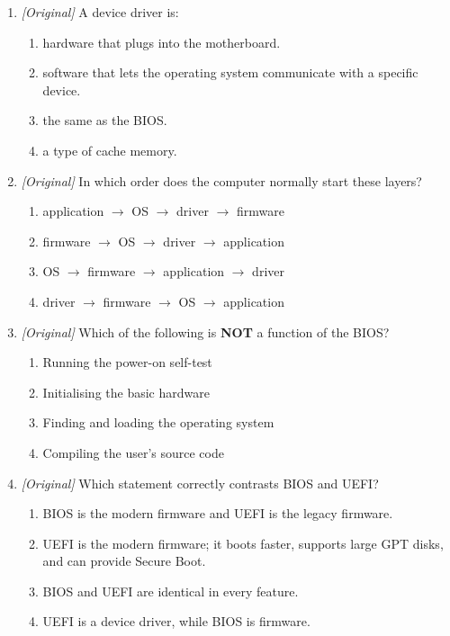 \begin{enumerate}[label=\textbf{Q\arabic*.}, leftmargin=*]
\begin{enumerate}[label=\Alph*.]
  \end{enumerate}
\item \textit{[Original]} A device driver is:
  \begin{enumerate}[label=\Alph*.]
    \item hardware that plugs into the motherboard.
    \item software that lets the operating system communicate with a
      specific device.
    \item the same as the BIOS.
    \item a type of cache memory.
  \end{enumerate}
\item \textit{[Original]} In which order does the computer normally start
  these layers?
  \begin{enumerate}[label=\Alph*.]
    \item application $\rightarrow$ OS $\rightarrow$ driver $\rightarrow$
      firmware
    \item firmware $\rightarrow$ OS $\rightarrow$ driver $\rightarrow$
      application
    \item OS $\rightarrow$ firmware $\rightarrow$ application $\rightarrow$
      driver
    \item driver $\rightarrow$ firmware $\rightarrow$ OS $\rightarrow$
      application
  \end{enumerate}
\item \textit{[Original]} Which of the following is \textbf{NOT} a function
  of the BIOS?
  \begin{enumerate}[label=\Alph*.]
    \item Running the power-on self-test
    \item Initialising the basic hardware
    \item Finding and loading the operating system
    \item Compiling the user's source code
  \end{enumerate}
\item \textit{[Original]} Which statement correctly contrasts BIOS and UEFI?
  \begin{enumerate}[label=\Alph*.]
    \item BIOS is the modern firmware and UEFI is the legacy firmware.
    \item UEFI is the modern firmware; it boots faster, supports large GPT
      disks, and can provide Secure Boot.
    \item BIOS and UEFI are identical in every feature.
    \item UEFI is a device driver, while BIOS is firmware.

\end{enumerate}
\end{enumerate}

